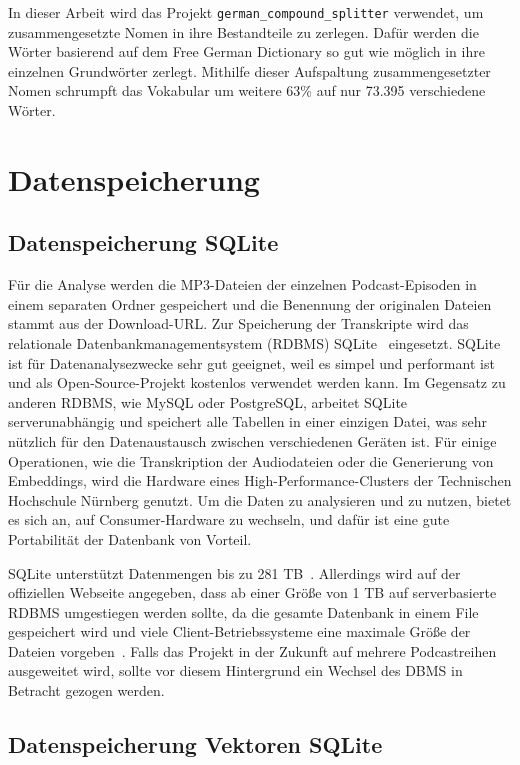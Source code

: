 In dieser Arbeit wird das Projekt \verb|german_compound_splitter|\cite{repodiac2023} verwendet, um zusammengesetzte Nomen in ihre Bestandteile zu zerlegen. 
Dafür werden die Wörter basierend auf dem Free German Dictionary\cite{2021} so gut wie möglich in ihre einzelnen Grundwörter zerlegt. 
Mithilfe dieser Aufspaltung zusammengesetzter Nomen schrumpft das Vokabular um weitere 63\% auf nur 73.395 verschiedene Wörter.


\section{Datenspeicherung}

\subsection{Datenspeicherung SQLite}

Für die Analyse werden die MP3-Dateien der einzelnen Podcast-Episoden in einem separaten Ordner gespeichert und die Benennung der originalen Dateien stammt aus der Download-URL.
Zur Speicherung der Transkripte wird das relationale Datenbankmanagementsystem (RDBMS) SQLite~\cite{zotero-553} eingesetzt. 
SQLite ist für Datenanalysezwecke sehr gut geeignet, weil es simpel und performant ist und als Open-Source-Projekt kostenlos verwendet werden kann.
Im Gegensatz zu anderen RDBMS, wie MySQL oder PostgreSQL, arbeitet SQLite serverunabhängig und speichert alle Tabellen in einer einzigen Datei, was sehr nützlich für den Datenaustausch zwischen verschiedenen Geräten ist.
Für einige Operationen, wie die Transkription der Audiodateien oder die Generierung von Embeddings, wird die Hardware eines High-Performance-Clusters der Technischen Hochschule Nürnberg genutzt.
Um die Daten zu analysieren und zu nutzen, bietet es sich an, auf Consumer-Hardware zu wechseln, und dafür ist eine gute Portabilität der Datenbank von Vorteil.

SQLite unterstützt Datenmengen bis zu 281 TB~\cite{zotero-553}.
Allerdings wird auf der offiziellen Webseite angegeben, dass ab einer Größe von 1 TB auf serverbasierte RDBMS umgestiegen werden sollte, da die gesamte Datenbank in einem File gespeichert wird und viele Client-Betriebssysteme eine maximale Größe der Dateien vorgeben~\cite{zotero-553}.
Falls das Projekt in der Zukunft auf mehrere Podcastreihen ausgeweitet wird, sollte vor diesem Hintergrund ein Wechsel des DBMS in Betracht gezogen werden.

\subsection{Datenspeicherung Vektoren SQLite}

